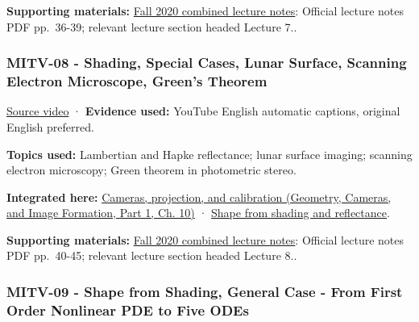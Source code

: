 \textbf{Supporting materials:} \href{https://ocw.mit.edu/courses/6-801-machine-vision-fall-2020/9ec44f69e72995c370b3797818ba01e6_MIT6_801F20_lectureNotes.pdf}{Fall 2020 combined lecture notes}: Official lecture notes PDF pp.~36-39; relevant lecture section headed Lecture 7..

\subsubsection{MITV-08 - Shading, Special Cases, Lunar Surface, Scanning Electron Microscope, Green's Theorem}\label{04-visual-computing-ii-ch036-mitv-08---shading-special-cases-lunar-surface-scanning-electron-microscope-greens-theorem}

\hypertarget{04-visual-computing-ii-ch036-mitv-08---shading-special-cases-lunar-surface-scanning-electron-microscope-greens-theorem}{}

\href{https://www.youtube.com/watch?v=LP7z6vVmnms}{Source video} · \textbf{Evidence used:} YouTube English automatic captions, original English preferred.

\textbf{Topics used:} Lambertian and Hapke reflectance; lunar surface imaging; scanning electron microscopy; Green theorem in photometric stereo.

\textbf{Integrated here:} \href{../03-Geometry-Cameras-and-Image-Formation-P01/main.pdf\#nameddest=03-visual-computing-i-ch003-cameras-projection-and-calibration}{Cameras, projection, and calibration (Geometry, Cameras, and Image Formation, Part 1, Ch. 10)} · \hyperref[04-visual-computing-ii-ch032-shape-from-shading-and-reflectance]{Shape from shading and reflectance}.

\textbf{Supporting materials:} \href{https://ocw.mit.edu/courses/6-801-machine-vision-fall-2020/9ec44f69e72995c370b3797818ba01e6_MIT6_801F20_lectureNotes.pdf}{Fall 2020 combined lecture notes}: Official lecture notes PDF pp.~40-45; relevant lecture section headed Lecture 8..

\subsubsection{MITV-09 - Shape from Shading, General Case - From First Order Nonlinear PDE to Five ODEs}\label{04-visual-computing-ii-ch036-mitv-09---shape-from-shading-general-case---from-first-order-nonlinear-pde-to-five-odes}

\hypertarget{04-visual-computing-ii-ch036-mitv-09---shape-from-shading-general-case---from-first-order-nonlinear-pde-to-five-odes}{}

